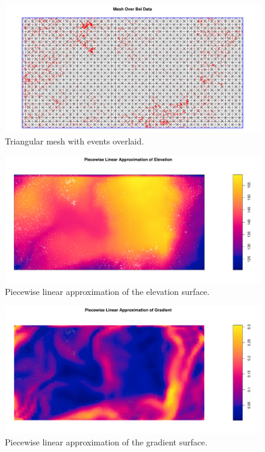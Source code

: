 \documentclass[]{interact}
\begin{document}
\begin{figure}[h]
\includegraphics[width=\textwidth]{figures/beimesh.pdf}
\caption{Triangular mesh with events overlaid.}
\label{beimesh}
\end{figure}

\begin{figure}[h]
\includegraphics[width=\textwidth]{figures/beielevmesh.pdf}
\caption{Piecewise linear approximation of the elevation surface.}
\label{beielevmesh}
\end{figure}

\begin{figure}[h]
\includegraphics[width=\textwidth]{figures/beigradmesh.pdf}
\caption{Piecewise linear approximation of the gradient surface.}
\label{beigradmesh}
\end{figure}
\end{document}
